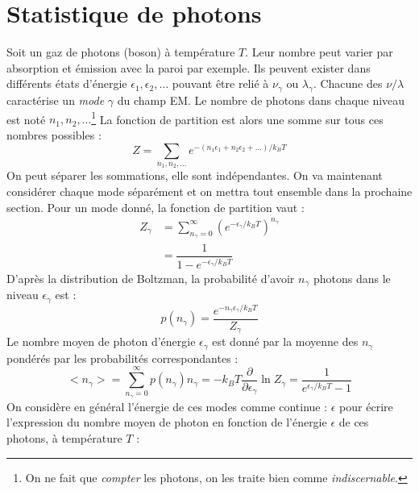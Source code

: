 \documentclass	[11pt, a4paper, openany]{book}
\begin{document}
		\section{Statistique de photons}
		Soit un gaz de photons (boson) à température $T$. Leur nombre peut varier par absorption et émission avec
		la paroi par exemple. Ils peuvent exister dans différents états d'énergie $\epsilon_1,\epsilon_2,\dots$ 
		pouvant être relié à $\nu_\gamma$ ou $\lambda_\gamma$. Chacune des $\nu/\lambda$ caractérise un 
		\textit{mode} $\gamma$ du champ EM. Le nombre de photons dans chaque niveau est noté $n_1,n_2,\dots$\footnote{
			On ne fait que \textit{compter} les photons, on les traite bien comme \textit{indiscernable}.} La 
		fonction de partition est alors une somme sur tous ces nombres possibles :
		\begin{equation}
			Z = \sum_{n_1,n_2,\dots} e^{-(n_1\epsilon_1 + n_2\epsilon_2 + \dots)/k_BT}
		\end{equation}
		On peut séparer les sommations, elle sont indépendantes. On va maintenant considérer chaque mode 
		séparément et on mettra tout ensemble dans la prochaine section. Pour un mode donné, la fonction de 
		partition vaut :
		\begin{equation}
			\begin{array}{ll}
				Z_\gamma & = \sum_{n_\gamma=0}^\infty \left(e^{-\epsilon_\gamma/k_BT}\right)^{n_\gamma} \\
				         & = \dfrac{1}{1-e^{-\epsilon_\gamma/k_BT}}                                     
			\end{array}
		\end{equation}
		D'après la distribution de Boltzman, la probabilité d'avoir $n_\gamma$ photons dans le niveau
		$\epsilon_\gamma$ est :
		\begin{equation}
			p(n_\gamma) = \dfrac{e^{-n_\gamma\epsilon_\gamma/k_BT}}{Z_\gamma}
		\end{equation}
		Le nombre moyen de photon d'énergie $\epsilon_\gamma$ est donné par la moyenne des $n_\gamma$ 
		pondérés par les probabilités correspondantes :
		\begin{equation}
			<n_\gamma> = \sum_{n_\gamma = 0}^\infty p(n_\gamma)n_\gamma = -k_BT\dfrac{\partial}{\partial\epsilon_
				\gamma}\ln Z_\gamma = \dfrac{1}{e^{\epsilon_\gamma/k_BT}-1}
		\end{equation}
		On considère en général l'énergie de ces modes comme continue : $\epsilon$ pour écrire l'expression du
		nombre moyen de photon en fonction de l'énergie $\epsilon$ de ces photons, à température $T$ :
\end{document}
